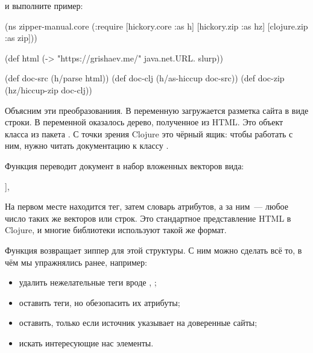 \begin{english}
  \begin{clojure}
[hickory "0.7.1"]
  \end{clojure}
\end{english}

\noindent
и выполните пример:

\begin{english}
  \begin{clojure}
(ns zipper-manual.core
  (:require
   [hickory.core :as h]
   [hickory.zip :as hz]
   [clojure.zip :as zip]))

(def html (-> "https://grishaev.me/"
              java.net.URL.
              slurp))

(def doc-src (h/parse html))
(def doc-clj (h/as-hiccup doc-src))
(def doc-zip (hz/hiccup-zip doc-clj))
  \end{clojure}
\end{english}

Объясним эти преобразованиия. В переменную  загружается разметка сайта в
виде строки. В переменной  оказалось дерево, полученное из HTML. Это
объект класса  из пакета . С точки зрения Clojure это
чёрный ящик: чтобы работать с ним, нужно читать документацию к классу
.

Функция  переводит документ в набор вложенных векторов вида:

\begin{english}
  \begin{clojure}
[:tag {:attr "value"} & [...]],
  \end{clojure}
\end{english}


На первом месте находится тег, затем словарь атрибутов, а за ним~--- любое число
таких же векторов или строк. Это стандартное представление HTML в Clojure, и
многие библиотеки используют такой же формат.


Функция  возвращает зиппер для этой структуры. С ним можно
сделать всё то, в чём мы упражнялись ранее, например:

\begin{itemize}

\item
  удалить нежелательные теги вроде , ;

\item
  оставить теги, но обезопасить их атрибуты;

\item
  оставить, только если источник указывает на доверенные сайты;

\item
  искать интересующие нас элементы.

\end{itemize}

